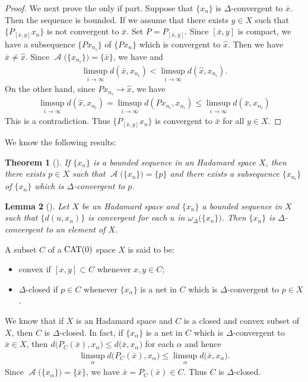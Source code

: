\documentclass[draft]{amsart}
\numberwithin{equation}{section}
\DeclareMathOperator{\AC}{\mathcal{A}}
\newcommand{\CAT}{\textup{CAT}}
\theoremstyle{plain}
\newtheorem{theorem}{Theorem}[section]
\newtheorem{lemma}[theorem]{Lemma}
\theoremstyle{definition}
\theoremstyle{remark}
\begin{document}
\begin{proof}
 We next prove the only if part. Suppose that 
 $\{x_{n}\}$ is $\Delta$-convergent to $\bar{x}$. 
 Then the sequence is bounded. If we assume that 
 there exists $y\in X$ such that 
 $\{P_{[\bar{x},y]}x_n\}$ is not convergent to $\bar{x}$. 
 Set $P=P_{[\bar{x},y]}$. Since $[\bar{x},y]$ is compact, 
 we have a subsequence $\{Px_{n_i}\}$ of $\{Px_n\}$ 
 which is convergent to $\hat{x}$. Then we have $\bar{x}\neq \hat{x}$. 
 Since $\AC\bigl(\{x_{n_i}\}\bigr)=\{\bar{x}\}$, we have  
 and 
 \begin{align}
  \limsup_{i\to \infty} d(\bar{x},x_{n_i})
  < \limsup_{i\to \infty} d(\hat{x},x_{n_i}). 
 \end{align}
 On the other hand, since $Px_{n_i}\to \hat{x}$, we have 
 \begin{align}
  \limsup_{i\to \infty} d(\hat{x},x_{n_i}) 
  =\limsup_{i\to \infty} d(Px_{n_i},x_{n_i}) 
  \leq \limsup_{i\to \infty} d(\bar{x},x_{n_i}) 
 \end{align}
 This is a contradiction. Thus 
 $\{P_{[\bar{x},y]}x_n\}$ is convergent to $\bar{x}$ 
 for all $y\in X$. 
\end{proof}
\fi

We know the following results: 

\begin{theorem}[\cite{MR2416076}]\label{thm:Kirk--Panyanak}
 If $\{x_n\}$ is a bounded sequence in an Hadamard space $X$, 
 then there exists $p\in X$ such that $\AC\bigl(\{x_n\}\bigr)=\{p\}$ 
 and there exists a subsequence $\{x_{n_i}\}$ of $\{x_n\}$ 
 which is $\Delta$-convergent to $p$. 
\end{theorem}

\begin{lemma}[\cite{MR3574140}]\label{lem:Kimura-K-omega}
 Let $X$ be an Hadamard space and $\{x_n\}$ a bounded sequence in $X$ such that 
 $\{d(u, x_n)\}$ is convergent 
 for each $u$ in $\omega_{\Delta}\bigl(\{x_n\}\bigr)$. 
 Then $\{x_n\}$ is $\Delta$-convergent to an element of $X$. 
\end{lemma}

A subset $C$ of a $\CAT(0)$ space $X$ is said to be: 
\begin{itemize}
 \item convex if $[x,y]\subset C$ whenever $x,y\in C$; 
 \item $\Delta$-closed if $p\in C$ whenever 
$\{x_{\alpha}\}$ is a net in $C$ which is $\Delta$-convergent to $p\in X$.  
\end{itemize}
We know that if $X$ is an Hadamard space and 
$C$ is a closed and convex subset of $X$, then 
$C$ is $\Delta$-closed. In fact, if $\{x_{\alpha}\}$ is a 
net in $C$ which is $\Delta$-convergent to $\bar{x}\in X$, 
then $d\bigl(P_C(\bar{x}), x_{\alpha}\bigr)
 \leq d\bigl(\bar{x}, x_{\alpha}\bigr)$ for each $\alpha$ 
and hence 
\begin{align*}
 \limsup_{\alpha} d\bigl(P_C(\bar{x}), x_{\alpha}\bigr)
 \leq \limsup_{\alpha}d\bigl(\bar{x}, x_{\alpha}\bigr). 
\end{align*}
Since $\AC\bigl(\{x_{\alpha}\}\bigr)=\{\bar{x}\}$, we have 
$\bar{x}=P_C(\bar{x})\in C$. Thus $C$ is $\Delta$-closed. 
\end{document}
